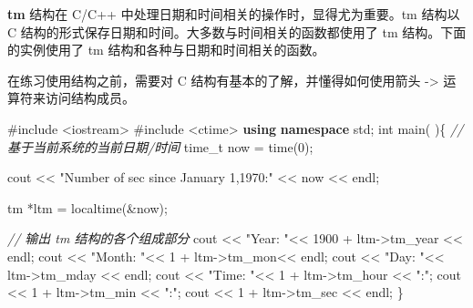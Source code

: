 \documentclass[
]{article}
\newenvironment{Shaded}{}{}
\newcommand{\CommentTok}[1]{\textcolor[rgb]{0.38,0.63,0.69}{\textit{#1}}}
\newcommand{\DataTypeTok}[1]{\textcolor[rgb]{0.56,0.13,0.00}{#1}}
\newcommand{\DecValTok}[1]{\textcolor[rgb]{0.25,0.63,0.44}{#1}}
\newcommand{\ImportTok}[1]{#1}
\newcommand{\KeywordTok}[1]{\textcolor[rgb]{0.00,0.44,0.13}{\textbf{#1}}}
\newcommand{\NormalTok}[1]{#1}
\newcommand{\OperatorTok}[1]{\textcolor[rgb]{0.40,0.40,0.40}{#1}}
\newcommand{\PreprocessorTok}[1]{\textcolor[rgb]{0.74,0.48,0.00}{#1}}
\newcommand{\StringTok}[1]{\textcolor[rgb]{0.25,0.44,0.63}{#1}}
\begin{document}
\textbf{tm} 结构在 C/C++ 中处理日期和时间相关的操作时，显得尤为重要。tm
结构以 C 结构的形式保存日期和时间。大多数与时间相关的函数都使用了 tm
结构。下面的实例使用了 tm 结构和各种与日期和时间相关的函数。

在练习使用结构之前，需要对 C 结构有基本的了解，并懂得如何使用箭头
-\textgreater{} 运算符来访问结构成员。

\begin{Shaded}
\begin{Highlighting}[]
\PreprocessorTok{\#include }\ImportTok{\textless{}iostream\textgreater{}}
\PreprocessorTok{\#include }\ImportTok{\textless{}ctime\textgreater{}}
\KeywordTok{using} \KeywordTok{namespace}\NormalTok{ std}\OperatorTok{;}
\DataTypeTok{int}\NormalTok{ main}\OperatorTok{(} \OperatorTok{)\{}
   \CommentTok{// 基于当前系统的当前日期/时间}
   \DataTypeTok{time\_t}\NormalTok{ now }\OperatorTok{=}\NormalTok{ time}\OperatorTok{(}\DecValTok{0}\OperatorTok{);}

\NormalTok{   cout }\OperatorTok{\textless{}\textless{}} \StringTok{"Number of sec since January 1,1970:"} \OperatorTok{\textless{}\textless{}}\NormalTok{ now }\OperatorTok{\textless{}\textless{}}\NormalTok{ endl}\OperatorTok{;}

\NormalTok{   tm }\OperatorTok{*}\NormalTok{ltm }\OperatorTok{=}\NormalTok{ localtime}\OperatorTok{(\&}\NormalTok{now}\OperatorTok{);}

   \CommentTok{// 输出 tm 结构的各个组成部分}
\NormalTok{   cout }\OperatorTok{\textless{}\textless{}} \StringTok{"Year: "}\OperatorTok{\textless{}\textless{}} \DecValTok{1900} \OperatorTok{+}\NormalTok{ ltm}\OperatorTok{{-}\textgreater{}}\NormalTok{tm\_year }\OperatorTok{\textless{}\textless{}}\NormalTok{ endl}\OperatorTok{;}
\NormalTok{   cout }\OperatorTok{\textless{}\textless{}} \StringTok{"Month: "}\OperatorTok{\textless{}\textless{}} \DecValTok{1} \OperatorTok{+}\NormalTok{ ltm}\OperatorTok{{-}\textgreater{}}\NormalTok{tm\_mon}\OperatorTok{\textless{}\textless{}}\NormalTok{ endl}\OperatorTok{;}
\NormalTok{   cout }\OperatorTok{\textless{}\textless{}} \StringTok{"Day: "}\OperatorTok{\textless{}\textless{}}\NormalTok{  ltm}\OperatorTok{{-}\textgreater{}}\NormalTok{tm\_mday }\OperatorTok{\textless{}\textless{}}\NormalTok{ endl}\OperatorTok{;}
\NormalTok{   cout }\OperatorTok{\textless{}\textless{}} \StringTok{"Time: "}\OperatorTok{\textless{}\textless{}} \DecValTok{1} \OperatorTok{+}\NormalTok{ ltm}\OperatorTok{{-}\textgreater{}}\NormalTok{tm\_hour }\OperatorTok{\textless{}\textless{}} \StringTok{":"}\OperatorTok{;}
\NormalTok{   cout }\OperatorTok{\textless{}\textless{}} \DecValTok{1} \OperatorTok{+}\NormalTok{ ltm}\OperatorTok{{-}\textgreater{}}\NormalTok{tm\_min }\OperatorTok{\textless{}\textless{}} \StringTok{":"}\OperatorTok{;}
\NormalTok{   cout }\OperatorTok{\textless{}\textless{}} \DecValTok{1} \OperatorTok{+}\NormalTok{ ltm}\OperatorTok{{-}\textgreater{}}\NormalTok{tm\_sec }\OperatorTok{\textless{}\textless{}}\NormalTok{ endl}\OperatorTok{;}
\OperatorTok{\}}
\end{Highlighting}
\end{Shaded}
\end{document}
